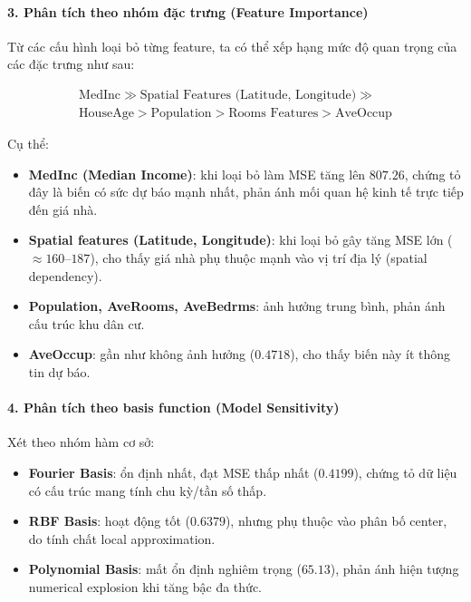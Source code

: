 \paragraph{3. Phân tích theo nhóm đặc trưng (Feature Importance)}

Từ các cấu hình loại bỏ từng feature, ta có thể xếp hạng mức độ quan trọng
của các đặc trưng như sau:

\[
\begin{aligned}
\text{MedInc} \gg \text{Spatial Features (Latitude, Longitude)} \gg \\
\text{HouseAge} > \text{Population} > \text{Rooms Features} > \text{AveOccup}
\end{aligned}
\]

Cụ thể:

\begin{itemize}
    \item \textbf{MedInc (Median Income)}:
    khi loại bỏ làm MSE tăng lên $807.26$, chứng tỏ đây là biến có sức dự báo mạnh nhất,
    phản ánh mối quan hệ kinh tế trực tiếp đến giá nhà.

    \item \textbf{Spatial features (Latitude, Longitude)}:
    khi loại bỏ gây tăng MSE lớn ($\approx 160$--$187$),
    cho thấy giá nhà phụ thuộc mạnh vào vị trí địa lý (spatial dependency).

    \item \textbf{Population, AveRooms, AveBedrms}:
    ảnh hưởng trung bình, phản ánh cấu trúc khu dân cư.

    \item \textbf{AveOccup}:
    gần như không ảnh hưởng ($0.4718$), cho thấy biến này ít thông tin dự báo.
\end{itemize}

\paragraph{4. Phân tích theo basis function (Model Sensitivity)}

Xét theo nhóm hàm cơ sở:

\begin{itemize}
    \item \textbf{Fourier Basis}:
    ổn định nhất, đạt MSE thấp nhất ($0.4199$),
    chứng tỏ dữ liệu có cấu trúc mang tính chu kỳ/tần số thấp.

    \item \textbf{RBF Basis}:
    hoạt động tốt ($0.6379$), nhưng phụ thuộc vào phân bố center,
    do tính chất local approximation.

    \item \textbf{Polynomial Basis}:
    mất ổn định nghiêm trọng ($65.13$),
    phản ánh hiện tượng numerical explosion khi tăng bậc đa thức.
\end{itemize}

